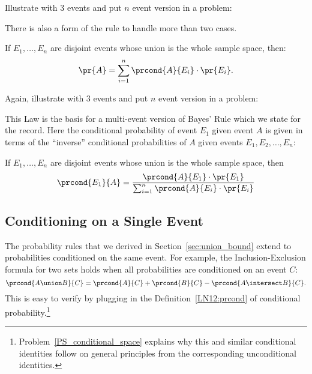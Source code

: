 \begin{editingnotes}
Illustrate with 3 events and put $n$ event version in a problem:
\end{editingnotes}

There is also a form of the rule to handle more than two cases.
\begin{rul}
If $E_1, \dots, E_n$ are disjoint events whose union is the whole
sample space, then:
\begin{equation}\label{multitotalprob}
\pr{A} = \sum_{i=1}^{n} \prcond{A}{E_i} \cdot \pr{E_i}.
\end{equation}
\end{rul}

\begin{editingnotes}
Again, illustrate with 3 events and put $n$ event version in a problem:
\end{editingnotes}

This Law is the basis for a multi-event version of Bayes' Rule which
we state for the record.  Here the conditional probability of event
$E_1$ given event $A$ is given in terms of the ``inverse'' conditional
probabilities of $A$ given events $E_1,E_2,\dots,E_n$:

\begin{theorem}
If $E_1, \dots, E_n$ are disjoint events whose union is the whole
sample space, then
\begin{equation}\label{multibayesrule}
\prcond{E_1}{A} = \frac{\prcond{A}{E_1}\cdot \pr{E_1}}{\sum_{i=1}^{n}
  \prcond{A}{E_i} \cdot \pr{E_i}}
\end{equation}
\end{theorem}


\subsection{Conditioning on a Single Event}\label{cond_ident_subsec}

The probability rules that we derived in Section~\ref{sec:union_bound}
extend to probabilities conditioned on the same event.  For example,
the Inclusion-Exclusion formula for two sets holds when all
probabilities are conditioned on an event $C$:
\[
\prcond{A \union B}{C} = \prcond{A}{C} + \prcond{B}{C} - \prcond{A \intersect B}{C}.
\]
This is easy to verify by plugging in the Definition~\ref{LN12:prcond}
of conditional
probability.\footnote{Problem~\ref{PS_conditional_space} explains why
  this and similar conditional identities follow on general principles
  from the corresponding unconditional identities.}

